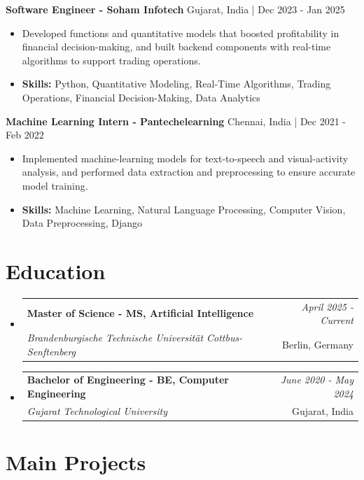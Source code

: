 \documentclass[a4paper,11pt]{article}
\makeatletter
\newcommand{\resumeSubheading}[4]{
\vspace{0.5mm}\item
    \begin{tabular*}{\linewidth}[t]{l@{\extracolsep{\fill}}r}
        \textbf{#1} & \textit{\footnotesize{#4}} \\
        \textit{\footnotesize{#3}} &  \footnotesize{#2}\\
    \end{tabular*}
    \vspace{-2.4mm}
}
\makeatother
\begin{document}
\vspace{1mm}
  \textbf{Software Engineer - Soham Infotech} \hfill Gujarat, India | Dec 2023 - Jan 2025
\vspace{-1.5mm} %
\begin{itemize}
  \item Developed functions and quantitative models that boosted profitability in financial decision-making, and built backend components with real-time algorithms to support trading operations.

\vspace{-2mm}
  \item \textbf{Skills:} Python, Quantitative Modeling, Real-Time Algorithms, Trading Operations, Financial Decision-Making, Data Analytics
\end{itemize}

\vspace{1mm}
  \textbf{Machine Learning Intern - Pantechelearning} \hfill Chennai, India | Dec 2021 - Feb 2022
\vspace{-1.5mm} %
\begin{itemize}
  \item Implemented machine-learning models for text-to-speech and visual-activity analysis, and performed data extraction and preprocessing to ensure accurate model training.
\vspace{-2mm}
  \item \textbf{Skills:} Machine Learning, Natural Language Processing, Computer Vision, Data Preprocessing, Django
\end{itemize}\section{\textbf{Education}}
\vspace{-0.4mm}

\begin{itemize}[leftmargin=0.15in, label={}]
\resumeSubheading
{Master of Science - MS, Artificial Intelligence }{Berlin, Germany}
{Brandenburgische Technische Universität Cottbus-Senftenberg  }{April 2025 - Current}

\vspace{1.0mm} %
\resumeSubheading
{Bachelor of Engineering - BE, Computer Engineering  }{Gujarat, India}
{Gujarat Technological University }{June 2020 - May 2024}

\end{itemize}
\section{\textbf{Main Projects}}
\end{document}
